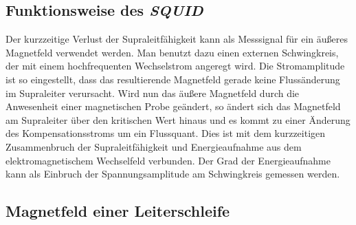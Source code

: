 \subsection{Funktionsweise des \emph{SQUID}}
Der kurzzeitige Verlust der Supraleitfähigkeit kann als Messsignal für ein äußeres Magnetfeld verwendet werden.
Man benutzt dazu einen externen Schwingkreis, der mit einem hochfrequenten Wechselstrom angeregt wird.
Die Stromamplitude ist so eingestellt, dass das resultierende Magnetfeld gerade keine Flussänderung
im Supraleiter verursacht. Wird nun das äußere Magnetfeld durch die Anwesenheit einer magnetischen Probe geändert,
so ändert sich das Magnetfeld am Supraleiter über den kritischen Wert hinaus und es kommt zu einer Änderung
des Kompensationsstroms um ein Flussquant. Dies ist mit dem kurzzeitigen
Zusammenbruch der Supraleitfähigkeit und Energieaufnahme aus dem elektromagnetischem Wechselfeld verbunden.
Der Grad der Energieaufnahme kann als Einbruch der Spannungsamplitude am Schwingkreis
gemessen werden.


\subsection{Magnetfeld einer Leiterschleife}

